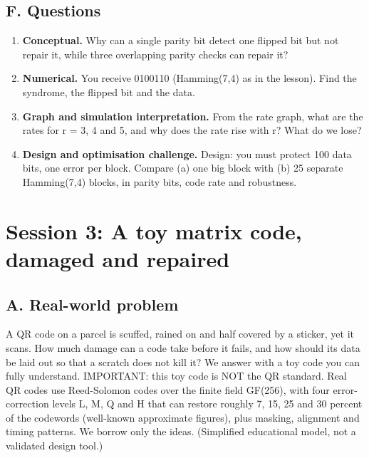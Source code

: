 \documentclass[11pt,a4paper]{article}
\begin{document}
\subsection*{F. Questions}
\begin{enumerate}[nosep]
\item \textbf{Conceptual.} Why can a single parity bit detect one flipped bit but not repair it, while three overlapping parity checks can repair it?
\item \textbf{Numerical.} You receive 0100110 (Hamming(7,4) as in the lesson). Find the syndrome, the flipped bit and the data.
\item \textbf{Graph and simulation interpretation.} From the rate graph, what are the rates for r = 3, 4 and 5, and why does the rate rise with r? What do we lose?
\item \textbf{Design and optimisation challenge.} Design: you must protect 100 data bits, one error per block. Compare (a) one big block with (b) 25 separate Hamming(7,4) blocks, in parity bits, code rate and robustness.
\end{enumerate}

\section{Session 3: A toy matrix code, damaged and repaired}

\subsection*{A. Real-world problem}
A QR code on a parcel is scuffed, rained on and half covered by a sticker, yet it scans. How much damage can a code take before it fails, and how should its data be laid out so that a scratch does not kill it? We answer with a toy code you can fully understand. IMPORTANT: this toy code is NOT the QR standard. Real QR codes use Reed-Solomon codes over the finite field GF(256), with four error-correction levels L, M, Q and H that can restore roughly 7, 15, 25 and 30 percent of the codewords (well-known approximate figures), plus masking, alignment and timing patterns. We borrow only the ideas. (Simplified educational model, not a validated design tool.)
\end{document}
